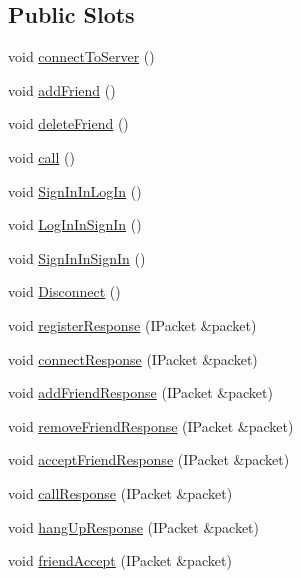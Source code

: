 \subsection*{Public Slots}
\begin{DoxyCompactItemize}
\item 
void \mbox{\hyperlink{classMainWindow_abfedef9edae209df536e8c1c7cf0e7ae}{connect\+To\+Server}} ()
\item 
void \mbox{\hyperlink{classMainWindow_ae28c5837e284dd761409d55b5e39813b}{add\+Friend}} ()
\item 
void \mbox{\hyperlink{classMainWindow_a9afb210ce554fd18f4e6a88f9348d277}{delete\+Friend}} ()
\item 
void \mbox{\hyperlink{classMainWindow_a4f6b5f8e574fd0b4973b66f3d00ffaf2}{call}} ()
\item 
void \mbox{\hyperlink{classMainWindow_a5af6c159766831c848b75c0d880c8fd4}{Sign\+In\+In\+Log\+In}} ()
\item 
void \mbox{\hyperlink{classMainWindow_a611f2a28a206782610bf8877cf77e0a2}{Log\+In\+In\+Sign\+In}} ()
\item 
void \mbox{\hyperlink{classMainWindow_a9c960d27c03a967b577bc60ad21cb6f8}{Sign\+In\+In\+Sign\+In}} ()
\item 
void \mbox{\hyperlink{classMainWindow_a4c998ea4be4f3f4ead67e5af459b89de}{Disconnect}} ()
\item 
void \mbox{\hyperlink{classMainWindow_a6753e34d0ff49db0d1fb93f716ec92e2}{register\+Response}} (I\+Packet \&packet)
\item 
void \mbox{\hyperlink{classMainWindow_aa2b3f69a6185302ac2ad76fef6acb528}{connect\+Response}} (I\+Packet \&packet)
\item 
void \mbox{\hyperlink{classMainWindow_ad2cbc6f96df012007bb9ee214a9b0576}{add\+Friend\+Response}} (I\+Packet \&packet)
\item 
void \mbox{\hyperlink{classMainWindow_a19ca92aa9a59b9b1a3211324d3c7fb8d}{remove\+Friend\+Response}} (I\+Packet \&packet)
\item 
void \mbox{\hyperlink{classMainWindow_a9565cefea1c1ba5dfb1c251a2aa8d822}{accept\+Friend\+Response}} (I\+Packet \&packet)
\item 
void \mbox{\hyperlink{classMainWindow_a2b5ea73e534de8287c7eadfb24db5acd}{call\+Response}} (I\+Packet \&packet)
\item 
void \mbox{\hyperlink{classMainWindow_a6cb8a7d117c4c4b9c2a9efbff9d0a9f6}{hang\+Up\+Response}} (I\+Packet \&packet)
\item 
void \mbox{\hyperlink{classMainWindow_a65832e63c031a59f7ab81c6e6e8d7eeb}{friend\+Accept}} (I\+Packet \&packet)

\end{DoxyCompactItemize}
